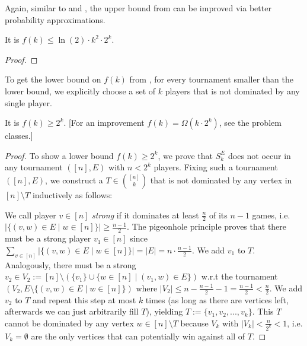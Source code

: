 \documentclass[../main.tex]{subfiles}
\begin{document}
Again, similar to  and , the upper bound from  can be improved via better probability approximations.

\begin{corollary}
	It is $f(k) \leq \ln(2)\cdot k^2 \cdot 2^k$.
\end{corollary}

\begin{proof}
	\TODO
\end{proof}

To get the lower bound on $f(k)$ from , for every tournament smaller than the lower bound, we explicitly choose a set of $k$ players that is not dominated by any single player. 

\begin{proposition}\label{prop:lowerTournament}
It is $f(k) \geq 2^k$. [For an improvement $f(k) = \Omega(k \cdot 2^k)$, see the problem classes.]
\end{proposition}

\begin{proof}
To show a lower bound $f(k) \geq 2^k$, we prove that $S_k^E$ does not occur in any tournament $([n], E)$ with $n < 2^k$ players. Fixing such a tournament $([n], E)$, we construct a $T \in \binom{[n]}{k}$ that is not dominated by any vertex in $[n] \setminus T$ inductively as follows: 

We call player $v \in [n]$ \textit{strong} if it dominates at least $\frac{n}{2}$ of its $n-1$ games, i.e. $|\{(v, w) \in E \mid w \in [n]\}| \geq \frac{n-1}{2}$. The pigeonhole principle proves that there must be a strong player $v_1 \in [n]$ since $\sum_{v \in [n]} |\{(v, w) \in E \mid w \in [n]\}| = |E| = n \cdot \frac{n-1}{2}$. We add $v_1$ to $T$. Analogously, there must be a strong $v_2 \in V_2 := [n] \setminus (\{v_1\} \cup \{w \in [n] \mid (v_1, w) \in E\})$ w.r.t the tournament $(V_2, E \setminus \{(v,w) \in E \mid w \in [n]\})$ where $|V_2| \leq n - \frac{n-1}{2} - 1 =  \frac{n-1}{2} < \frac{n}{2}$. We add $v_2$ to $T$ and repeat this step at most $k$ times (as long as there are vertices left, afterwards we can just arbitrarily fill $T$), yielding $T := \{v_1, v_2, ..., v_k\}$. This $T$ cannot be dominated by any vertex $w \in [n] \setminus T$ because $V_k$ with $|V_k| < \frac{n}{2^k} < 1$, i.e. $V_k = \emptyset$ are the only vertices that can potentially win against all of $T$. \TODO{\textcolor{red}{rewrite, image}}
\end{proof}
\end{document}
